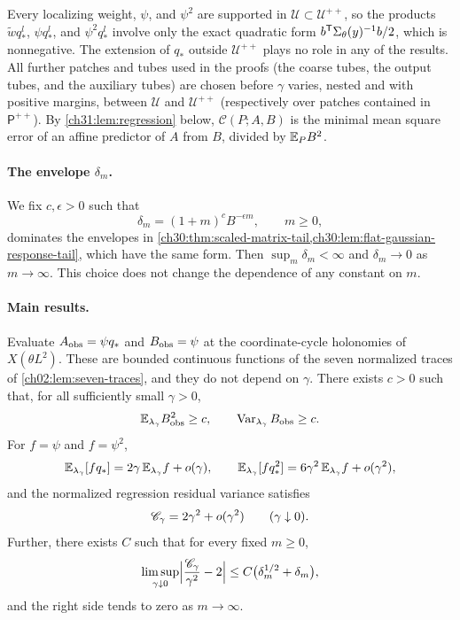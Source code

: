 Every localizing weight, $\psi$, and $\psi^2$ are supported in $\mathcal U\subset\mathcal U^{++}$, so the products $\widetilde wq_*^l$, $\psi q_*^l$, and $\psi^2q_*^l$ involve only the exact quadratic form $b^{\mathsf T}\Sigma_\theta(y)^{-1}b/2$, which is nonnegative. The extension of $q_*$ outside $\mathcal U^{++}$ plays no role in any of the results. All further patches and tubes used in the proofs (the coarse tubes, the output tubes, and the auxiliary tubes) are chosen before $\gamma$ varies, nested and with positive margins, between $\mathcal U$ and $\mathcal U^{++}$ (respectively over patches contained in $\mathsf P^{++}$). By \cref{ch31:lem:regression} below, $\mathscr C(P;A,B)$ is the minimal mean square error of an affine predictor of $A$ from $B$, divided by $\mathbb E_PB^2$.

\paragraph{The envelope $\delta_m$.}
We fix $c,\epsilon>0$ such that
\[
 \delta_m=(1+m)^cB^{-\epsilon m},\qquad m\ge0,
\]
dominates the envelopes in \cref{ch30:thm:scaled-matrix-tail,ch30:lem:flat-gaussian-response-tail}, which have the same form. Then $\sup_m\delta_m<\infty$ and $\delta_m\to0$ as $m\to\infty$. This choice does not change the dependence of any constant on $m$.

\paragraph{Main results.}

\begin{theorem}\label{ch31:thm:regular-toron-statistic}
Evaluate $A_{\mathrm{obs}}=\psi q_*$ and $B_{\mathrm{obs}}=\psi$ at the coordinate-cycle holonomies of $X(\theta L^2)$. These are bounded continuous functions of the seven normalized traces of \cref{ch02:lem:seven-traces}, and they do not depend on $\gamma$. There exists $c>0$ such that, for all sufficiently small $\gamma>0$,
\[
 \mathbb E_{\lambda_\gamma}B_{\mathrm{obs}}^2\ge c,\qquad\operatorname{Var}_{\lambda_\gamma}B_{\mathrm{obs}}\ge c.
\]
For $f=\psi$ and $f=\psi^2$,
\[
 \mathbb E_{\lambda_\gamma}[fq_*]=2\gamma\,\mathbb E_{\lambda_\gamma}f+o(\gamma),\qquad
 \mathbb E_{\lambda_\gamma}[fq_*^2]=6\gamma^2\,\mathbb E_{\lambda_\gamma}f+o(\gamma^2),
\]
and the normalized regression residual variance satisfies
\[
 \mathscr C_\gamma=2\gamma^2+o(\gamma^2)\qquad(\gamma\downarrow0).
\]
Further, there exists $C$ such that for every fixed $m\ge0$,
\[
 \limsup_{\gamma\downarrow0}\Bigl\lvert\frac{\mathscr C_\gamma}{\gamma^2}-2\Bigr\rvert\le C\bigl(\delta_m^{1/2}+\delta_m\bigr),
\]
and the right side tends to zero as $m\to\infty$.
\end{theorem}

